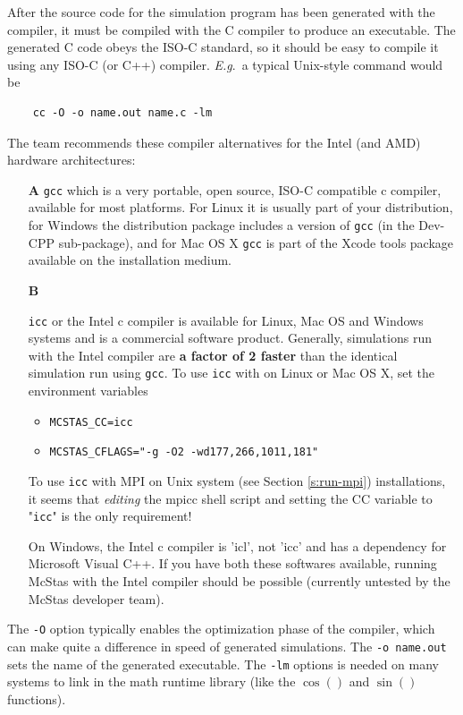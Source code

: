 After the source code for the simulation program has been generated with
the \MCS compiler, it must be compiled with the C compiler to produce
an executable. The generated C code obeys the ISO-C standard, so it
should be easy to compile it using any ISO-C (or C++) compiler. \textit{E.g}.\ a
typical Unix-style command would be
\begin{lstlisting}
    cc -O -o name.out name.c -lm
\end{lstlisting}
The \MCS team recommends these compiler alternatives for the Intel
(and AMD) hardware architectures:
\begin{itemize}
\item[\bf A]{\verb+gcc+ which is a very portable, open source, ISO-C
    compatible c compiler, available for most platforms. For Linux it
    is usually part of your distribution, for Windows the \MCS
    distribution package includes a version of \verb+gcc+
    (in the Dev-CPP sub-package), and for Mac OS X \verb+gcc+ is part
    of the Xcode tools package available on the installation medium.}
\item[\bf B]{\verb+icc+ or the Intel c compiler is available for Linux, Mac
    OS and Windows systems and is a commercial software
    product. Generally, simulations run with the Intel compiler are
    {\bf a factor of 2 faster} than the identical simulation run using \verb+gcc+. To use \verb+icc+ with \MCS on Linux or Mac OS X, set the environment variables
    \begin{itemize}
      \item{\verb+MCSTAS_CC=icc+}
      \item{\verb+MCSTAS_CFLAGS="-g -O2 -wd177,266,1011,181"+}
    \end{itemize}
    To use \verb+icc+ with MPI on Unix system (see Section \ref{s:run-mpi})
 installations, it seems that \emph{editing}
    the mpicc shell script and setting the CC variable to "\verb+icc+" is the
    only requirement!}
    On Windows, the Intel c compiler is 'icl', not 'icc' and has a dependency for Microsoft Visual C++. If you have both these softwares available, running McStas with the Intel compiler should be possible (currently untested by the McStas developer team).

\end{itemize}


The \verb+-O+ option typically enables the optimization phase of the compiler,
which can make quite a difference in speed of \MCS generated simulations. The
\verb+-o name.out+ sets the name of the generated executable. The \verb+-lm+
options is needed on many systems to link in the math runtime library (like the
$\cos()$ and $\sin()$ functions). 


